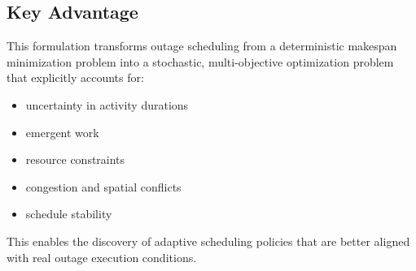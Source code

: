 \subsection{Key Advantage}

This formulation transforms outage scheduling from a deterministic makespan minimization problem into a stochastic, multi-objective optimization problem that explicitly accounts for:
\begin{itemize}
\item uncertainty in activity durations
\item emergent work
\item resource constraints
\item congestion and spatial conflicts
\item schedule stability
\end{itemize}

This enables the discovery of adaptive scheduling policies that are better aligned with real outage execution conditions.